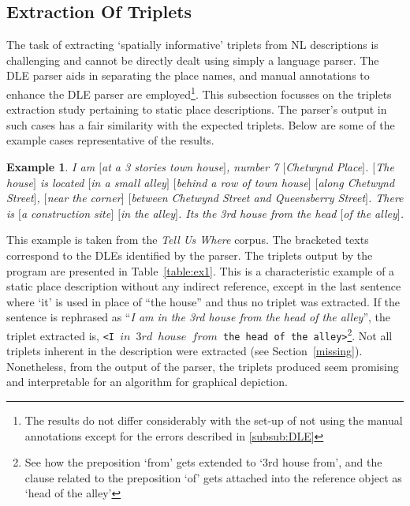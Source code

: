 \documentclass{acm_proc_article-sp}
\begin{document}
\subsection{Extraction Of Triplets}
\label{extraction}
The task of extracting `spatially informative' triplets from NL descriptions is challenging and cannot be directly dealt using simply a language parser. The DLE parser aids in separating the place names, and manual annotations to enhance the DLE parser are employed\footnote{The results do not differ considerably with the set-up of not using the manual annotations except for the errors described in \ref{subsub:DLE}}. This subsection focusses on the triplets extraction study pertaining to static place descriptions. The parser's output in such cases has a fair similarity with the expected triplets. Below are some of the example cases representative of the results.
\newtheorem{example}{Example}
\begin{example}
I am $[$at a 3 stories town house$]$, number 7 $[$Chetwynd Place$]$. $[$The house$]$ is located $[$in a small alley$]$ $[$behind a row of town house$]$ $[$along Chetwynd Street$]$, $[$near the corner$]$ $[$between Chetwynd Street and Queensberry Street$]$. There is $[$a construction site$]$ $[$in the alley$]$. Its the 3rd house from the head $[$of the alley$]$.
\end{example}
This example is taken from the \textit{Tell Us Where} corpus. The bracketed texts correspond to the DLEs identified by the parser. The triplets output by the program are presented in Table~\ref{table:ex1}. This is a characteristic example of a static place description without any indirect reference, except in the last sentence where `it' is used in place of ``the house'' and thus no triplet was extracted. If the sentence is rephrased as ``\textit{I am in the 3rd house from the head of the alley}'', the triplet extracted is, \texttt{<I $in$ $3rd$ $house$ $from$ the head of the alley>}\footnote{See how the preposition `from' gets extended to `3rd house from', and the clause related to the preposition `of' gets attached into the reference object as `head of the alley'}. Not all triplets inherent in the description were extracted (see Section~\ref{missing}). Nonetheless, from the output of the parser, the triplets produced seem promising and interpretable for an algorithm for graphical depiction.
\end{document}
